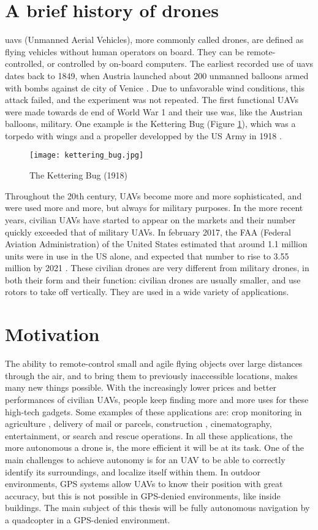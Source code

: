 \section{A brief history of drones}
\Glspl{uav} (Unmanned Aerial Vehicles), more commonly called drones, are defined as flying vehicles without human operators on board. They can be remote-controlled, or controlled by on-board computers. The earliest recorded use of \glspl{uav} dates back to 1849, when Austria launched about 200 unmanned balloons armed with bombs against de city of Venice \cite{anthology}. Due to unfavorable wind conditions, this attack failed, and the experiment was not repeated. The first functional UAVs were made towards de end of World War 1 and their use was, like the Austrian balloons, military. One example is the Kettering Bug (Figure \ref{fig:ketteringbug}), which was a torpedo with wings and a propeller developped by the US Army in 1918 \cite{dronesww1}.
\begin{figure}[H]
  \centering
  \texttt{[image: kettering\_bug.jpg]}
    \caption{The Kettering Bug (1918)}
    \label{fig:ketteringbug}
\end{figure}

Throughout the 20th century, UAVs become more and more sophisticated, and were used more and more, but always for military purposes. In the more recent years, civilian UAVs have started to appear on the markets and their number quickly exceeded that of military UAVs. In february 2017, the FAA (Federal Aviation Administration) of the United States estimated that around 1.1 million units were in use in the US alone, and expected that number to rise to 3.55 million by 2021 \cite{consumerdronesbythenumbers}. These civilian drones are very different from military drones, in both their form and their function: civilian drones are usually smaller, and use rotors to take off vertically. They are used in a wide variety of applications.

\section{Motivation}
The ability to remote-control small and agile flying objects over large distances through the air, and to bring them to previously inaccessible locations, makes many new things possible. With the increasingly lower prices and better performances of civilian UAVs, people keep finding more and more uses for these high-tech gadgets. Some examples of these applications are: crop monitoring in agriculture \cite{agriculturaldrones}, delivery of mail or parcels, construction \cite{batiravecdesdrones}, cinematography, entertainment, or search and rescue operations. In all these applications, the more autonomous a drone is, the more efficient it will be at its task. One of the main challenges to achieve autonomy is for an UAV to be able to correctly identify its surroundings, and localize itself within them. In outdoor environments, GPS systems allow UAVs to know their position with great accuracy, but this is not possible in GPS-denied environments, like inside buildings. The main subject of this thesis will be fully autonomous navigation by a quadcopter in a GPS-denied environment.

